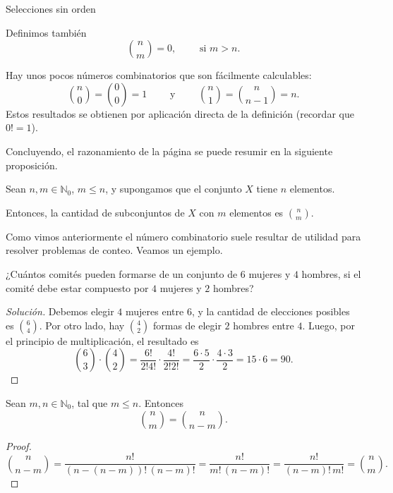 \begin{section}{Selecciones sin orden}
\begin{definicion}
Definimos también
$$
\binom{n}{m} = 0,\qquad \text{ si } m > n.
$$
\end{definicion}

\begin{observacion*} Hay unos pocos números combinatorios que son fácilmente calculables: 
$$
\binom{n}{0} = \binom{0}{0} = 1 \qquad \text{ y }\qquad  \binom{n}{1} = \binom{n}{n-1} = n. 
$$
Estos resultados se obtienen por aplicación directa de la definición (recordar que  $0! =1$). 
\end{observacion*}

Concluyendo, el razonamiento de la página \pageref{eleciones-sin-orden-sin-repeticion} se puede resumir en la siguiente proposición.

\begin{proposicion}
Sean $n, m \in \mathbb N_0$, $m \le n$, y supongamos que el conjunto $X$ tiene $n$ elementos.

Entonces, la cantidad de subconjuntos de $X$ con $m$ elementos es $\displaystyle\binom{n}{m}$.
\end{proposicion}

Como vimos anteriormente el número combinatorio suele resultar de utilidad para resolver pro\-ble\-mas de conteo. Veamos un ejemplo.

\begin{ejemplo*}
 ¿Cuántos comités pueden formarse de un conjunto de $6$ mujeres y $4$ hombres, si el comité debe estar compuesto por $4$ mujeres y $2$ hombres?
\end{ejemplo*}
\begin{proof}[Solución] Debemos elegir $4$ mujeres entre $6$, y la cantidad de elecciones posibles es   $\binom{6}{4}$. Por otro lado, hay $ \binom{4}{2}$ formas de elegir $2$ hombres entre $4$. Luego, por el principio de multiplicación,  el resultado es
    $$
    \binom{6}{3}\cdot \binom{4}{2} = \frac{6!}{2!4!}\cdot\frac{4!}{2!2!} = \frac{6\cdot 5}{2}\cdot\frac{4\cdot 3}{2} = 15 \cdot 6 = 90.
    $$
\end{proof}

\begin{proposicion}\label{simcomb}
Sean $m,n \in \mathbb N_0$, tal que $m \le n$. Entonces
$$
\binom{n}{m} = \binom{n}{n-m}.
$$
\end{proposicion}
\begin{proof}
$$
\binom{n}{n-m} = \frac{n!}{(n-(n-m))!\,(n-m)!} =  \frac{n!}{m!\,(n-m)!} =   \frac{n!}{(n-m)!\,m!} = \binom{n}{m}.
$$
\end{proof}



\end{section}
